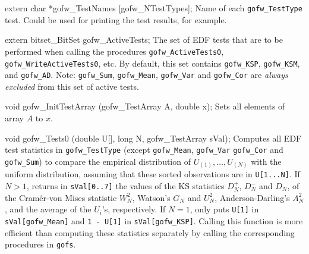 extern char *gofw_TestNames [gofw_NTestTypes];
\endcode
 \tab  Name of each {\tt gofw\_TestType} test. 
  Could be used for printing the test results, for example.
 \endtab
\code


extern bitset_BitSet gofw_ActiveTests;
\endcode
 \tab The set of EDF tests that are to be performed when calling
  the procedures {\tt gofw\_ActiveTests0}, {\tt gofw\_WriteActiveTests0}, etc.
  By default, this set contains {\tt gofw\_KSP}, {\tt gofw\_KSM},
  and {\tt gofw\_AD}.  %
  Note: {\tt gofw\_Sum}, {\tt gofw\_Mean}, {\tt gofw\_Var} and {\tt gofw\_Cor} are 
  {\em always excluded\/} from this set of active tests.
 \endtab
\code


void gofw_InitTestArray (gofw_TestArray A, double x);
\endcode
 \tab Sets all elements of array $A$ to $x$.
 \endtab
\code


void gofw_Tests0 (double U[], long N, gofw_TestArray sVal);
\endcode
\tab  Computes all EDF test statistics in {\tt gofw\_TestType} (except
 {\tt gofw\_Mean}, {\tt gofw\_Var} {\tt gofw\_Cor} and  {\tt gofw\_Sum})
  to compare the empirical 
  distribution of  $U_{(1)},\dots,U_{(N)}$ with the uniform distribution,
  assuming that these sorted observations are in {\tt U[1...N]}.
  If $N > 1$, returns in {\tt sVal[0..7]} the values of the KS
  statistics $D_N^+$, $D_N^-$ and $D_N$, of the Cram\'er-von Mises 
  statistic $W_N^2$, Watson's $G_N$ and $U_N^2$, Anderson-Darling's
  $A_N^2$, and the average of the $U_i$'s, respectively.
  If $N = 1$, only puts {\tt U[1]} in {\tt sVal[gofw\_Mean]}  
  and {\tt 1 - U[1]} in {\tt sVal[gofw\_KSP]}.
  Calling this function is more efficient than computing these statistics
  separately by calling the corresponding procedures in {\tt gofs}.
\endtab
\code


